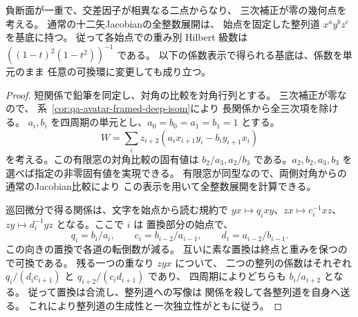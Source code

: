 \begin{proposition}[三次補正が零の二交点境界のPBW基底]
\label{prop:qa-avatar-diagonal-boundary-pbw}
負断面が一重で、交差因子が相異なる二点からなり、
三次補正が零の幾何点を考える。
通常の十二矢Jacobianの全整数展開は、
始点を固定した整列道 $x^a y^b z^c$ を基底に持つ。
従って各始点での重み別 Hilbert 級数は
$((1-t)^2(1-t^2))^{-1}$ である。
以下の係数表示で得られる基底は、係数を単元のまま
任意の可換環に変更しても成り立つ。
\end{proposition}
\begin{proof}
短関係で鉛筆を同定し、対角の比較を対角行列とする。
三次補正が零なので、
系~\ref{cor:qa-avatar-framed-deep-isom}により
長関係から全三次項を除ける。
$a_i,b_i$ を四周期の単元とし、$a_0=b_0=a_1=b_1=1$ とする。
\[
 W=\sum_i z_{i+2}
       (a_i x_{i+1}y_i-b_i y_{i+1}x_i)
\]
を考える。この有限窓の対角比較の固有値は
$b_2/a_3,a_2/b_3$ である。$a_2,b_2,a_3,b_3$ を
選べば指定の非零固有値を実現できる。
有限窓が同型なので、両側対角からの通常のJacobian比較により
この表示を用いて全整数展開を計算できる。

巡回微分で得る関係は、文字を始点から読む規約で
$yx\mapsto q_i xy$、$zx\mapsto c_i^{-1}xz$、
$zy\mapsto d_i^{-1}yz$ となる。ここで $i$ は
置換部分の始点で、
\[
 q_i=b_i/a_i,\qquad c_i=b_{i-2}/a_{i-1},\qquad
 d_i=a_{i-2}/b_{i-1}.
\]
この向きの置換で各道の転倒数が減る。
互いに素な置換は終点と重みを保つので可換である。
残る一つの重なり $zyx$ について、
二つの整列の係数はそれぞれ
$q_i/(d_i c_{i+1})$ と $q_{i+2}/(c_i d_{i+1})$ であり、
四周期によりどちらも $b_i/a_{i+2}$ となる。
従って置換は合流し、整列道への写像は
関係を殺して各整列道を自身へ送る。
これにより整列道の生成性と一次独立性がともに従う。
\end{proof}

